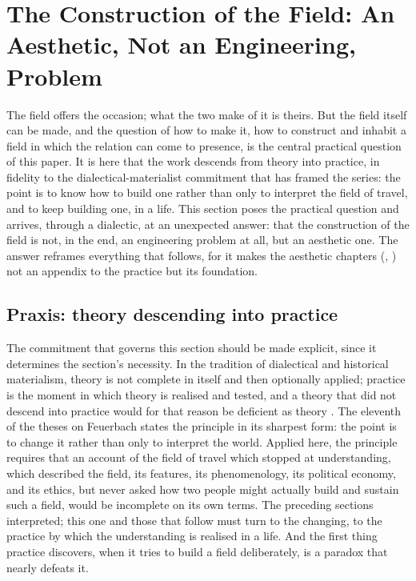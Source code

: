 \section{The Construction of the Field: An Aesthetic, Not an Engineering, Problem}
\label{p21:sec:construction}

\noindent
The field offers the occasion; what the two make of it is theirs. But the field itself can be made, and the question of how to make it, how to construct and inhabit a field in which the relation can come to presence, is the central practical question of this paper. It is here that the work descends from theory into practice, in fidelity to the dialectical-materialist commitment that has framed the series: the point is to know how to build one rather than only to interpret the field of travel, and to keep building one, in a life. This section poses the practical question and arrives, through a dialectic, at an unexpected answer: that the construction of the field is not, in the end, an engineering problem at all, but an aesthetic one. The answer reframes everything that follows, for it makes the aesthetic chapters (, ) not an appendix to the practice but its foundation.

\subsection{Praxis: theory descending into practice}
\label{p21:sub:constr-praxis}

The commitment that governs this section should be made explicit, since it determines the section's necessity. In the tradition of dialectical and historical materialism, theory is not complete in itself and then optionally applied; practice is the moment in which theory is realised and tested, and a theory that did not descend into practice would for that reason be deficient as theory \parencite{marx1992}. The eleventh of the theses on Feuerbach states the principle in its sharpest form: the point is to change it rather than only to interpret the world. Applied here, the principle requires that an account of the field of travel which stopped at understanding, which described the field, its features, its phenomenology, its political economy, and its ethics, but never asked how two people might actually build and sustain such a field, would be incomplete on its own terms. The preceding sections interpreted; this one and those that follow must turn to the changing, to the practice by which the understanding is realised in a life. And the first thing practice discovers, when it tries to build a field deliberately, is a paradox that nearly defeats it.

